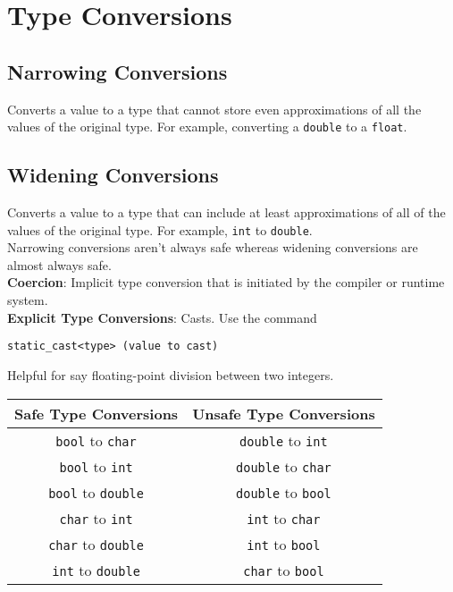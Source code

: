 \documentclass{article}
\begin{document}
	\section{Type Conversions}
	
	\subsection{Narrowing Conversions}
	
	Converts a value to a type that cannot store even approximations of all the values of the original type. For example, converting a \verb|double| to a \verb|float|.
	
	\subsection{Widening Conversions}
	
	Converts a value to a type that can include at least approximations of all of the values of the original type. For example, \verb|int| to \verb|double|.\\
	
	Narrowing conversions aren't always safe whereas widening conversions are almost always safe.\\
	
	\textbf{Coercion}: Implicit type conversion that is initiated by the compiler or runtime system.\\
	
	\textbf{Explicit Type Conversions}: Casts. Use the command
	\begin{lstlisting}[gobble=12]
			static_cast<type> (value to cast)
	\end{lstlisting}	
	Helpful for say floating-point division between two integers.
	
	\begin{center}
		\begin{tabular}{c|c}
			   Safe Type Conversions       &   Unsafe Type Conversions     \\ \hline
			 \verb|bool| to \verb|char|    &  \verb|double| to \verb|int|  \\
			 \verb|bool| to \verb|int|     &  \verb|double| to \verb|char| \\
			 \verb|bool| to \verb|double|  &  \verb|double| to \verb|bool| \\
			 \verb|char| to \verb|int|     &  \verb|int|    to \verb|char| \\
			 \verb|char| to \verb|double|  &  \verb|int|    to \verb|bool| \\
			 \verb|int|  to \verb|double|  &  \verb|char|   to \verb|bool|
		\end{tabular}
	\end{center}
	
\end{document}
